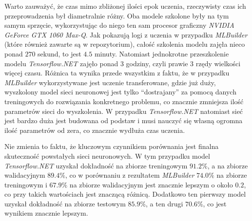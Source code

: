 Warto zauważyć, że czas mimo zbliżonej ilości epok uczenia, rzeczywisty czas ich przeprowadzenia był diametralnie różny.
Oba modele szkolone były na tym samym sprzęcie, wykorzystując do niego ten sam procesor graficzny \emph{NVIDIA GeForce GTX 1060 Max-Q}.
Jak pokazują logi z uczenia w przypadku \emph{MLBuilder} (które również zawarte są w repozytorium), całość szkolenia modelu zajęła nieco ponad $270$ sekund, to jest $4.5$ minuty.
Natomiast jednokrotne przeszkolenie modelu \emph{Tensorflow.NET} zajęło ponad 3 godziny, czyli prawie 3 rzędy wielkości więcej czasu.
Różnica ta wynika przede wszystkim z faktu, że w przypadku \emph{MLBuilder} wykorzystywane jest uczenie transferowane, gdzie już duży, wyszkolony model sieci neuronowej jest tylko ``dostrajany'' za pomocą danych treningowych do rozwiązania konkretnego problemu, co znacznie zmniejsza ilość parametrów sieci do wyszkolenia.
W przypadku \emph{Tensorflow.NET} natomiast sieć jest bardzo duża jest budowana od podstaw i musi nauczyć się własną ogromna ilość parametrów od zera, co znacznie wydłuża czas uczenia.

Nie zmienia to faktu, że kluczowym czynnikiem porównania jest finalna skuteczność powstałych sieci neuronowych.
W tym przypadku model \emph{Tensorflow.NET} uzyskał dokładność na zbiorze treningowym $91.2\%$, a na zbiorze walidacyjnym $89.4\%$, co w porównaniu z rezultatem \emph{MLBuilder} $74.0\%$ na zbiorze treningowym i $67.9\%$ na zbiorze walidacyjnym jest znacznie lepszym o około $0.2$, co przy takich wartościach jest znaczącą różnicą.
Dodatkowo ten pierwszy model uzyskał dokładność na zbiorze testowym $85.9\%$, a ten drugi $70.6\%$, co jest wynikiem znacznie lepszym.

